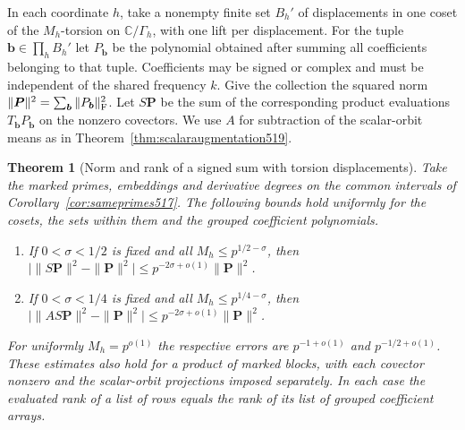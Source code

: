 \documentclass[a4paper,11pt]{article}
\newtheorem{theorem}[proposition]{Theorem}
\theoremstyle{definition}
\theoremstyle{remark}
\numberwithin{equation}{section}
\begin{document}
In each coordinate \(h\), take a nonempty finite set \(B_h'\) of
displacements in one coset of the \(M_h\)-torsion on
\(\mathbb C/\Gamma_h\), with one lift per displacement. For the
tuple \(\boldsymbol b\in\prod_h B_h'\) let \(P_{\boldsymbol b}\)
be the polynomial obtained after summing all coefficients belonging
to that tuple. Coefficients may be signed or complex and must be
independent of the shared frequency \(k\). Give the collection
the squared norm \(\|\boldsymbol P\|^2=\sum_{\boldsymbol b}
\|P_{\boldsymbol b}\|_{\rm F}^2\). Let \(S\boldsymbol P\) be the
sum of the corresponding product evaluations \(T_{\boldsymbol b}
P_{\boldsymbol b}\) on the nonzero covectors. We use \(A\) for
subtraction of the scalar-orbit means as in
Theorem~\ref{thm:scalaraugmentation519}.

\begin{theorem}[Norm and rank of a signed sum with torsion displacements]\leavevmode
\label{thm:signedtranslation520}
Take the marked primes, embeddings and derivative degrees on the
common intervals of Corollary~\ref{cor:sameprimes517}. The following
bounds hold uniformly for the cosets, the sets within them and the
grouped coefficient polynomials.
\begin{enumerate}
\item If \(0<\sigma<1/2\) is fixed and all \(M_h\le p^{1/2-\sigma}\),
then \(\big|\|S\boldsymbol P\|^2-\|\boldsymbol P\|^2\big|
\le p^{-2\sigma+o(1)}\|\boldsymbol P\|^2\).
\item If \(0<\sigma<1/4\) is fixed and all \(M_h\le p^{1/4-\sigma}\),
then \(\big|\|AS\boldsymbol P\|^2-\|\boldsymbol P\|^2\big|
\le p^{-2\sigma+o(1)}\|\boldsymbol P\|^2\).
\end{enumerate}
For uniformly \(M_h=p^{o(1)}\) the respective errors are
\(p^{-1+o(1)}\) and \(p^{-1/2+o(1)}\). These estimates also hold
for a product of marked blocks, with each covector nonzero and
the scalar-orbit projections imposed separately. In each case
the evaluated rank of a list of rows equals the rank of its list
of grouped coefficient arrays.
\end{theorem}
\end{document}
